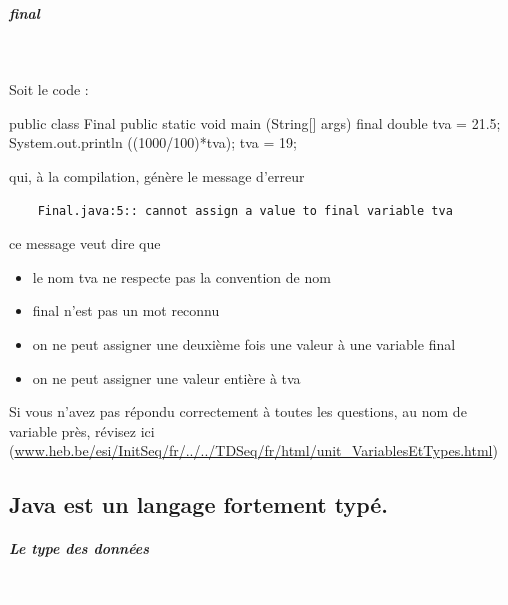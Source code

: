 \documentclass[11pt,a4paper]{article}
\begin{document}
			
		\subparagraph{final} 
		
					\textcolor{white}{.} \par
				
            \par
        
					Soit le code :
				
            \par
        \begin{Java}
	public class Final {  
		public static void main (String[] args) {
			final double tva = 21.5; 
			System.out.println ((1000/100)*tva);  
			tva = 19;
		}
	}			\end{Java}
					qui, \`a la compilation, g\'en\`ere le message d'erreur 
				
            \par
        \begin{verbatim}
	Final.java:5:: cannot assign a value to final variable tva\end{verbatim}ce message veut dire que
            \begin{itemize} 
        
            \item[ \ding{"6D} ] le nom tva ne respecte pas la convention de nom
        
            \item[ \ding{"6D} ] final n'est pas un mot reconnu
        
            \item[ \ding{"6D} ] on ne peut assigner une deuxi\`eme fois une valeur \`a une variable final
        
            \item[ \ding{"6D} ] on ne peut assigner une valeur enti\`ere \`a tva 
        
            \end{itemize} 
        Si vous n'avez pas r\'epondu correctement \`a toutes les questions, au nom de variable pr\`es,
				r\'evisez ici (\url{www.heb.be/esi/InitSeq/fr/../../TDSeq/fr/html/unit\_VariablesEtTypes.html})
            \par
        \subsection{Java est un langage fortement typ\'e.}
			
		\subparagraph{Le type des donn\'ees} 
		
                \textcolor{white}{.} \par
             
\end{document}
